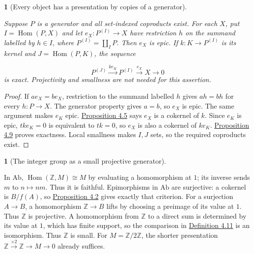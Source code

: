 \documentclass[11pt,a4paper]{article}
\newcommand{\mathheading}{}
\theoremstyle{plain}
\newtheorem*{plainstatement}{\mathheading}
\theoremstyle{definition}
\newtheorem*{definitionstatement}{\mathheading}
\newenvironment{mathstatement}[3]{\renewcommand{\mathheading}{#1 #2}\begin{plainstatement}[#3]}{\end{plainstatement}}
\newenvironment{mathdefinition}[3]{\renewcommand{\mathheading}{#1 #2}\begin{definitionstatement}[#3]}{\end{definitionstatement}}
\begin{document}
\begin{mathstatement}{Proposition}{4.14}{Every object has a presentation by copies of a generator}
\label{env-4-14}

Suppose \(P\) is a generator and all set-indexed coproducts exist. For each \(X\), put \(I=\operatorname{Hom}(P,X)\) and let \(e_X:P^{(I)}\to X\) have restriction \(h\) on the summand labelled by \(h\in I\), where \(P^{(I)}=\coprod_{I}P\). Then \(e_X\) is epic. If \(k:K\to P^{(I)}\) is its kernel and \(J=\operatorname{Hom}(P,K)\), the sequence

\[P^{(J)}\xrightarrow{k e_K}P^{(I)}\xrightarrow{e_X}X\longrightarrow0\] 
is exact. Projectivity and smallness are not needed for this assertion.


\par{}\par

\end{mathstatement}
 
\begin{proof}

If \(a e_X=b e_X\), restriction to the summand labelled \(h\) gives \(ah=bh\) for every \(h:P\to X\). The generator property gives \(a=b\), so \(e_X\) is epic. The same argument makes \(e_K\) epic. \hyperref[env-4-5]{Proposition 4.5} says \(e_X\) is a cokernel of \(k\). Since \(e_K\) is epic, \(t k e_K=0\) is equivalent to \(t k=0\), so \(e_X\) is also a cokernel of \(k e_K\). \hyperref[env-4-9]{Proposition 4.9} proves exactness. Local smallness makes \(I,J\) sets, so the required coproducts exist.


\end{proof}
 
\begin{mathdefinition}{Example}{4.15}{The integer group as a small projective generator}
\label{env-4-15}

In \(\mathrm{Ab}\), \(\operatorname{Hom}(\mathbb Z,M)\cong M\) by evaluating a homomorphism at \(1\); its inverse sends \(m\) to \(n\mapsto nm\). Thus it is faithful. Epimorphisms in \(\mathrm{Ab}\) are surjective: a cokernel is \(B/f(A)\), so \hyperref[env-4-2]{Proposition 4.2} gives exactly that criterion. For a surjection \(A\to B\), a homomorphism \(\mathbb Z\to B\) lifts by choosing a preimage of its value at \(1\). Thus \(\mathbb Z\) is projective. A homomorphism from \(\mathbb Z\) to a direct sum is determined by its value at \(1\), which has finite support, so the comparison in \hyperref[env-4-11]{Definition 4.11} is an isomorphism. Thus \(\mathbb Z\) is small. For \(M=\mathbb Z/2\mathbb Z\), the shorter presentation \(\mathbb Z\xrightarrow{\times2}\mathbb Z\to M\to0\) already suffices.


\par{}\par

\end{mathdefinition}
 
\end{document}
